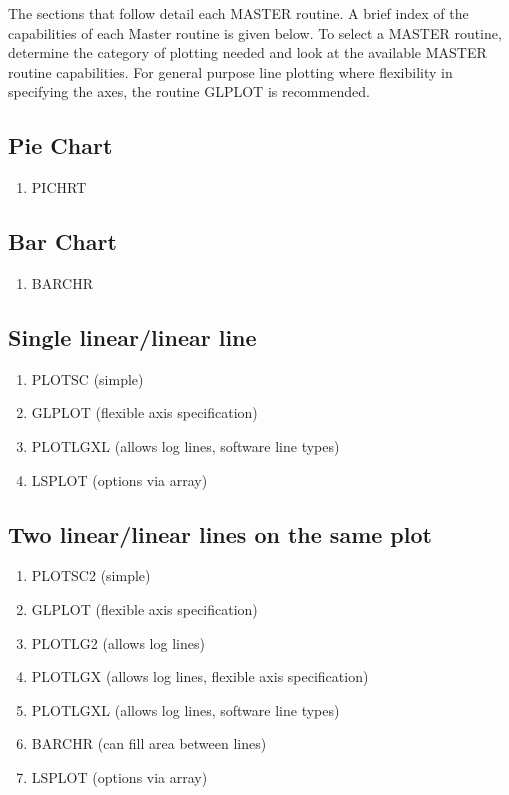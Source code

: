 \documentclass[11pt]{report}
\begin{document}
The sections that follow detail each MASTER routine.  A brief index
of the capabilities of each Master routine is given below.  To select
a MASTER routine, determine the category of plotting needed and
look at the available MASTER routine capabilities.  For general purpose
line plotting where flexibility in specifying the axes,
the routine GLPLOT is recommended.

\subsection{Pie Chart}
\begin{enumerate}
\item  PICHRT
\end{enumerate}

\subsection{Bar Chart}
\begin{enumerate}
\item  BARCHR 
\end{enumerate}

\subsection{Single linear/linear line}
\begin{enumerate}
\item  PLOTSC (simple)
\item  GLPLOT (flexible axis specification)
\item  PLOTLGXL (allows log lines, software line types)
\item  LSPLOT (options via array)
\end{enumerate}

\subsection{Two linear/linear lines on the same plot}
\begin{enumerate}
\item  PLOTSC2  (simple)
\item  GLPLOT   (flexible axis specification)
\item  PLOTLG2  (allows log lines)
\item  PLOTLGX  (allows log lines, flexible axis specification)
\item  PLOTLGXL (allows log lines, software line types)
\item  BARCHR   (can fill area between lines)
\item  LSPLOT (options via array)
\end{enumerate}
\end{document}
